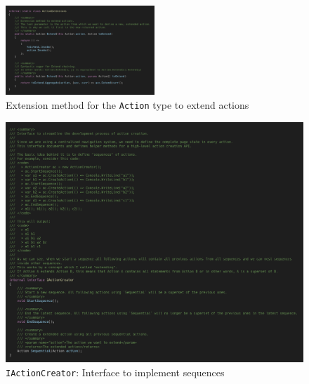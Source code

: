 \begin{figure}
\centering
\includegraphics[width=0.5\textwidth]{figures/code/nav-arch/action-extensions.png}
\caption[Extending \texttt{Action} type]{Extension method for the \texttt{Action} type to extend actions}
\label{fig:navsystem.sequences.extension}
\end{figure}

\begin{figure}
\centering
\includegraphics[width=\textwidth]{figures/code/nav-arch/IActionCreator-full.png}
\caption[Sequence interface implementation]{\texttt{IActionCreator}: Interface to implement sequences}
\label{fig:navsystem.iactioncreator}
\end{figure}


